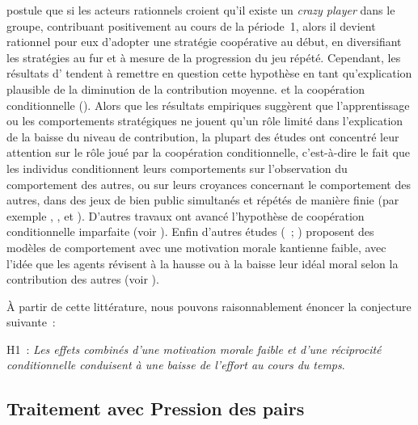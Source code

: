 \begin{Article}
\begin{refsection}[Lebourges]
\begin{appendices}
{  postule que si les acteurs rationnels croient qu'il existe un
  \emph{crazy player} dans le groupe, contribuant positivement au cours
  de la période~1, alors il devient rationnel pour eux d'adopter une
  stratégie coopérative au début, en diversifiant les stratégies au fur
  et à mesure de la progression du jeu répété. Cependant, les résultats
  d'\textcite{Andreoni1988} tendent à remettre en question cette hypothèse
  en tant qu'explication plausible de la diminution de la contribution
  moyenne.} et la coopération conditionnelle (\textcite{FischbacherGächterFehr2001}). Alors que les résultats empiriques suggèrent que
l'apprentissage ou les comportements stratégiques ne jouent qu'un rôle
limité dans l'explication de la baisse du niveau de contribution, la
plupart des études ont concentré leur attention sur le rôle joué par la
coopération conditionnelle, c'est-à-dire le fait que les individus
conditionnent leurs comportements sur l'observation du comportement des
autres, ou sur leurs croyances concernant le comportement des autres,
dans des jeux de bien public simultanés et répétés de manière finie (par
exemple \textcite{KeserVanWinder2000}, \textcite{FischbacherGächterFehr2001}, \textcite{Croson2007} et \textcite{FischbacherGächter2010}).
D'autres travaux ont avancé l'hypothèse de coopération conditionnelle
imparfaite (voir \textcite{FischbacherGächter2010}). Enfin d'autres
études (\textcite{FiguièresMascletWillinger2013}~; \textcite{MascletDickinson2019}) proposent des modèles de comportement avec une
motivation morale kantienne faible, avec l'idée que les agents révisent
à la hausse ou à la baisse leur idéal moral selon la contribution des
autres (voir \textcite{BrekkeKverndokkNyborg2003}).

À partir de cette littérature, nous pouvons raisonnablement énoncer la
conjecture suivante~:

\vspace{0,2cm}
H1~: \emph{Les effets combinés d'une motivation morale faible et d'une
réciprocité conditionnelle conduisent à une baisse de l'effort au cours
du temps}.

\subsection{Traitement avec Pression des pairs}


\end{appendices}
\end{refsection}
\end{Article}
